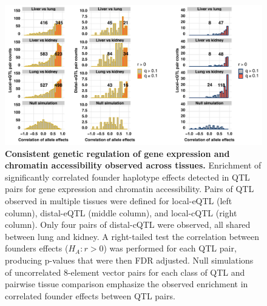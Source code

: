 \documentclass[9pt,twocolumn,twoside]{gsajnl}
\begin{document}
\begin{figure}[hp]
\renewcommand{\familydefault}{\sfdefault}\normalfont
\centering
\includegraphics[width=\textwidth, trim={0in 0in 0in 0in}, clip]{figs/qtl_pair_cor_histograms.pdf}
\caption{\textbf{Consistent genetic regulation of gene expression and chromatin accessibility observed across tissues.} Enrichment of significantly correlated founder haplotype effects detected in QTL pairs for gene expression and chromatin accessibility. Pairs of QTL observed in multiple tissues were defined for local-eQTL (left column), distal-eQTL (middle column), and local-cQTL (right column). Only four pairs of distal-cQTL were observed, all shared between lung and kidney. A right-tailed test the correlation between founders effects ($H_{A}: r > 0$) was performed for each QTL pair, producing p-values that were then FDR adjusted. Null simulations of uncorrelated 8-element vector pairs for each class of QTL and pairwise tissue comparison emphasize the observed enrichment in correlated founder effects between QTL pairs.  
\label{fig:qtl_pair_histograms}}
\end{figure}
\end{document}
